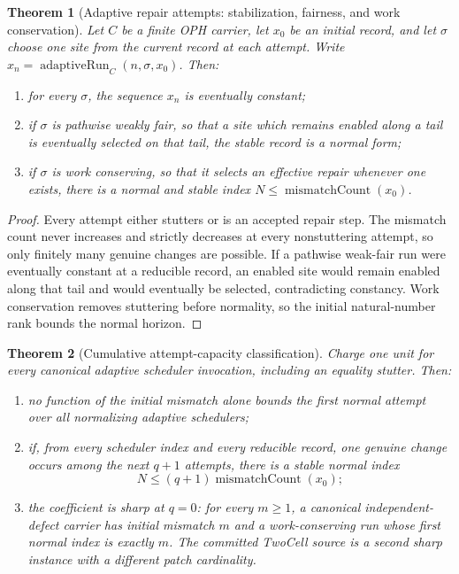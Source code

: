 \documentclass[11pt]{article}
\newtheorem{theorem}{Theorem}[section]
\theoremstyle{remark}
\theoremstyle{plain}
\begin{document}
\begin{theorem}[Adaptive repair attempts: stabilization, fairness, and work conservation]
\label{thm:adaptive-repair-stratification}
Let \(C\) be a finite OPH carrier, let \(x_0\) be an initial record, and let
\(\sigma\) choose one site from the current record at each attempt.  Write
\(x_n=\operatorname{adaptiveRun}_C(n,\sigma,x_0)\).  Then:
\begin{enumerate}[label=(\roman*)]
\item for every \(\sigma\), the sequence \(x_n\) is eventually constant;
\item if \(\sigma\) is pathwise weakly fair, so that a site which remains
enabled along a tail is eventually selected on that tail, the stable record is
a normal form;
\item if \(\sigma\) is work conserving, so that it selects an effective repair
whenever one exists, there is a normal and stable index
\(N\le\operatorname{mismatchCount}(x_0)\).
\end{enumerate}
\end{theorem}

\begin{proof}
Every attempt either stutters or is an accepted repair step.  The mismatch
count never increases and strictly decreases at every nonstuttering attempt,
so only finitely many genuine changes are possible.  If a pathwise weak-fair
run were eventually constant at a reducible record, an enabled site would
remain enabled along that tail and would eventually be selected, contradicting
constancy.  Work conservation removes stuttering before normality, so the
initial natural-number rank bounds the normal horizon.
\end{proof}

\begin{theorem}[Cumulative attempt-capacity classification]
\label{thm:cumulative-attempt-capacity}
Charge one unit for every canonical adaptive scheduler invocation, including
an equality stutter.  Then:
\begin{enumerate}[label=(\roman*)]
\item no function of the initial mismatch alone bounds the first normal
attempt over all normalizing adaptive schedulers;
\item if, from every scheduler index and every reducible record, one genuine
change occurs among the next \(q+1\) attempts, there is a stable normal index
\[
N\le(q+1)\operatorname{mismatchCount}(x_0);
\]
\item the coefficient is sharp at \(q=0\): for every \(m\ge1\), a canonical
independent-defect carrier has initial mismatch \(m\) and a work-conserving
run whose first normal index is exactly \(m\).  The committed TwoCell source
is a second sharp instance with a different patch cardinality.
\end{enumerate}
\end{theorem}
\end{document}
